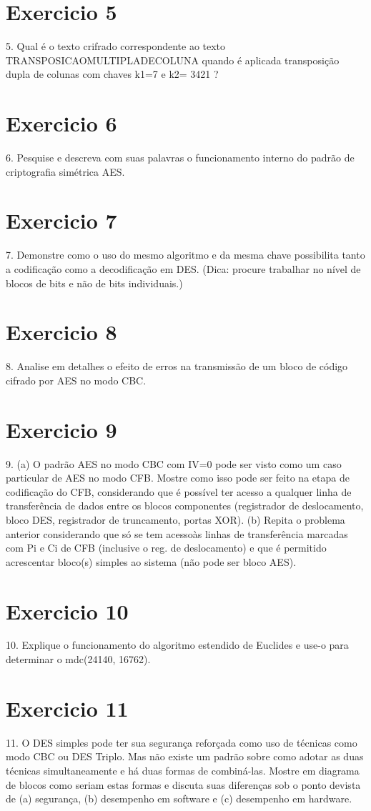 \documentclass[10pt,a4paper]{report}
\begin{document}
\section{Exercicio 5}
5. Qual é o texto crifrado correspondente ao texto
TRANSPOSICAOMULTIPLADECOLUNA
quando é aplicada transposição dupla de colunas com chaves k1=7 e k2= 3421 ?
\section{Exercicio 6}
6. Pesquise e descreva com suas palavras o funcionamento interno do padrão de criptografia simétrica AES.
\section{Exercicio 7}
7. Demonstre como o uso do mesmo algoritmo e da mesma chave possibilita tanto a codificação como a decodificação em DES. (Dica: procure trabalhar no nível de blocos de bits e não de bits individuais.)
\section{Exercicio 8}
8. Analise em detalhes o efeito de erros na transmissão de um bloco de código cifrado por AES no modo CBC.
\section{Exercicio 9}
9. (a) O padrão AES no modo CBC com IV=0 pode ser visto como um caso particular de AES no modo CFB. Mostre como isso pode ser feito na etapa de codificação do CFB, considerando que é possível ter acesso a qualquer linha de transferência de dados entre os blocos componentes (registrador de deslocamento, bloco DES, registrador de truncamento, portas XOR).
(b) Repita o problema anterior considerando que só se tem acessoàs linhas de transferência marcadas com Pi e Ci de CFB (inclusive o reg. de deslocamento) e que é permitido acrescentar bloco(s) simples ao sistema (não pode ser bloco AES).
\section{Exercicio 10}
10. Explique o funcionamento do algoritmo estendido de Euclides e use-o para determinar o mdc(24140, 16762).
\section{Exercicio 11}
11. O DES simples pode ter sua segurança reforçada como uso de técnicas como modo CBC ou DES Triplo. Mas não existe um padrão sobre como adotar as duas técnicas simultaneamente e há duas formas de combiná-las. Mostre em diagrama de blocos como seriam estas formas e discuta suas diferenças sob o ponto devista de (a) segurança, (b) desempenho em software e (c) desempenho em hardware.
\end{document}
